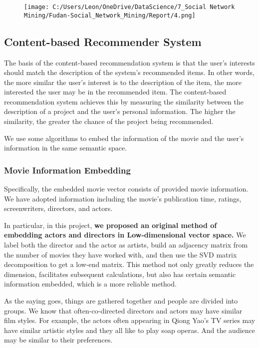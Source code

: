 \documentclass[]{article}
\begin{document}
\begin{figure}
\centering
\texttt{[image: C:/Users/Leon/OneDrive/DataScience/7\_Social Network Mining/Fudan-Social\_Network\_Mining/Report/4.png]}
\caption{}
\end{figure}

\hypertarget{header-n223}{%
\subsection{Content-based Recommender System}\label{header-n223}}

The basis of the content-based recommendation system is that the user's
interests should match the description of the system's recommended
items. In other words, the more similar the user's interest is to the
description of the item, the more interested the user may be in the
recommended item. The content-based recommendation system achieves this
by measuring the similarity between the description of a project and the
user's personal information. The higher the similarity, the greater the
chance of the project being recommended.

We use some algorithms to embed the information of the movie and the
user's information in the same semantic space.

\hypertarget{header-n228}{%
\subsubsection{Movie Information Embedding}\label{header-n228}}

Specifically, the embedded movie vector consists of provided movie
information. We have adopted information including the movie's
publication time, ratings, screenwriters, directors, and actors.

In particular, in this project, \textbf{we proposed an original method
of embedding actors and directors in Low-dimensional vector space.} We
label both the director and the actor as artists, build an adjacency
matrix from the number of movies they have worked with, and then use the
SVD matrix decomposition to get a low-end matrix. This method not only
greatly reduces the dimension, facilitates subsequent calculations, but
also has certain semantic information embedded, which is a more reliable
method.

As the saying goes, things are gathered together and people are divided
into groups. We know that often-co-directed directors and actors may
have similar film styles. For example, the actors often appearing in
Qiong Yao's TV series may have similar artistic styles and they all like
to play soap operas. And the audience may be similar to their
preferences.
\end{document}
